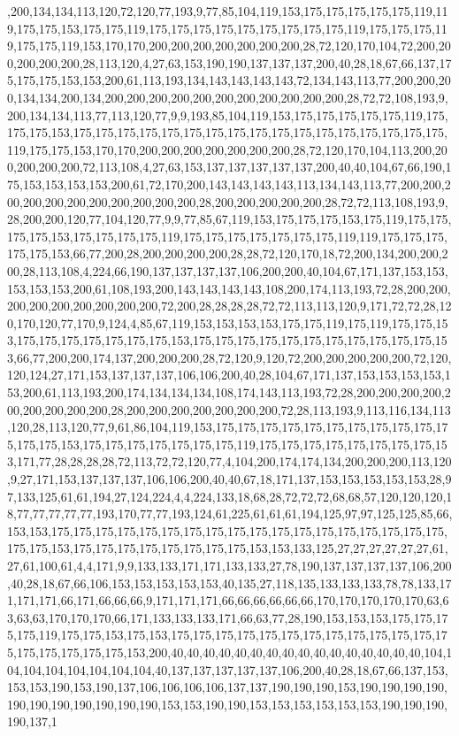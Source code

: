 ,200,134,134,113,120,72,120,77,193,9,77,85,104,119,153,175,175,175,175,175,119,119,175,175,153,175,175,119,175,175,175,175,175,175,175,175,175,119,175,175,175,119,175,175,119,153,170,170,200,200,200,200,200,200,200,28,72,120,170,104,72,200,200,200,200,200,28,113,120,4,27,63,153,190,190,137,137,137,200,40,28,18,67,66,137,175,175,175,153,153,200,61,113,193,134,143,143,143,143,72,134,143,113,77,200,200,200,134,134,200,134,200,200,200,200,200,200,200,200,200,200,200,28,72,72,108,193,9,200,134,134,113,77,113,120,77,9,9,193,85,104,119,153,175,175,175,175,175,119,175,175,175,153,175,175,175,175,175,175,175,175,175,175,175,175,175,175,175,175,175,119,175,175,153,170,170,200,200,200,200,200,200,200,28,72,120,170,104,113,200,200,200,200,200,72,113,108,4,27,63,153,137,137,137,137,137,200,40,40,104,67,66,190,175,153,153,153,153,200,61,72,170,200,143,143,143,143,113,134,143,113,77,200,200,200,200,200,200,200,200,200,200,200,28,200,200,200,200,200,28,72,72,113,108,193,9,28,200,200,120,77,104,120,77,9,9,77,85,67,119,153,175,175,175,153,175,119,175,175,175,175,153,175,175,175,175,119,175,175,175,175,175,175,175,119,119,175,175,175,175,175,153,66,77,200,28,200,200,200,200,28,28,72,120,170,18,72,200,134,200,200,200,28,113,108,4,224,66,190,137,137,137,137,106,200,200,40,104,67,171,137,153,153,153,153,153,200,61,108,193,200,143,143,143,143,108,200,174,113,193,72,28,200,200,200,200,200,200,200,200,200,72,200,28,28,28,28,72,72,113,113,120,9,171,72,72,28,120,170,120,77,170,9,124,4,85,67,119,153,153,153,153,175,175,119,175,119,175,175,153,175,175,175,175,175,175,175,153,175,175,175,175,175,175,175,175,175,175,175,153,66,77,200,200,174,137,200,200,200,28,72,120,9,120,72,200,200,200,200,200,72,120,120,124,27,171,153,137,137,137,106,106,200,40,28,104,67,171,137,153,153,153,153,153,200,61,113,193,200,174,134,134,134,108,174,143,113,193,72,28,200,200,200,200,200,200,200,200,200,28,200,200,200,200,200,200,200,72,28,113,193,9,113,116,134,113,120,28,113,120,77,9,61,86,104,119,153,175,175,175,175,175,175,175,175,175,175,175,175,175,153,175,175,175,175,175,175,175,119,175,175,175,175,175,175,175,175,153,171,77,28,28,28,28,72,113,72,72,120,77,4,104,200,174,174,134,200,200,200,113,120,9,27,171,153,137,137,137,106,106,200,40,40,67,18,171,137,153,153,153,153,153,28,97,133,125,61,61,194,27,124,224,4,4,224,133,18,68,28,72,72,72,68,68,57,120,120,120,18,77,77,77,77,77,193,170,77,77,193,124,61,225,61,61,61,194,125,97,97,125,125,85,66,153,153,175,175,175,175,175,175,175,175,175,175,175,175,175,175,175,175,175,175,175,175,153,175,175,175,175,175,175,175,175,153,153,133,125,27,27,27,27,27,27,61,27,61,100,61,4,4,171,9,9,133,133,171,171,133,133,27,78,190,137,137,137,137,106,200,40,28,18,67,66,106,153,153,153,153,153,40,135,27,118,135,133,133,133,78,78,133,171,171,171,66,171,66,66,66,9,171,171,171,66,66,66,66,66,66,170,170,170,170,170,63,63,63,63,170,170,170,66,171,133,133,133,171,66,63,77,28,190,153,153,153,175,175,175,175,119,175,175,153,175,153,175,175,175,175,175,175,175,175,175,175,175,175,175,175,175,175,175,175,153,200,40,40,40,40,40,40,40,40,40,40,40,40,40,40,40,40,104,104,104,104,104,104,104,104,40,137,137,137,137,137,106,200,40,28,18,67,66,137,153,153,153,190,153,190,137,106,106,106,106,137,137,190,190,190,153,190,190,190,190,190,190,190,190,190,190,190,153,153,190,190,153,153,153,153,153,153,190,190,190,190,137,1